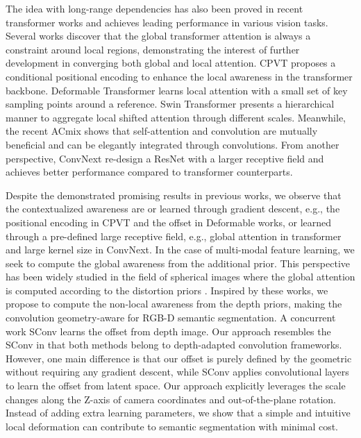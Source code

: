 \documentclass[lettersize,journal]{IEEEtran}
\begin{document}
The idea with long-range dependencies has also been proved in recent transformer works \cite{vaswani2017attention,vit,liu2021Swin} and achieves leading performance in various vision tasks. Several works \cite{chu2021conditional,liu2021Swin} discover that the global transformer attention is always a constraint around local regions, demonstrating the interest of further development in converging both global and local attention. CPVT \cite{chu2021conditional} proposes a conditional positional encoding to enhance the local awareness in the transformer backbone. Deformable Transformer \cite{deformabledetr} learns local attention with a small set of key sampling points around a reference. Swin Transformer \cite{liu2021Swin} presents a hierarchical manner to aggregate local shifted attention through different scales. Meanwhile, the recent ACmix \cite{pan2021integration} shows that self-attention and convolution are mutually beneficial and can be elegantly integrated through  convolutions. From another perspective, ConvNext \cite{liu2022convnet} re-design a ResNet with a larger receptive field and achieves better performance compared to transformer counterparts.

Despite the demonstrated promising results in previous works, we observe that the contextualized awareness are or learned through gradient descent, e.g., the positional encoding in CPVT and the offset in Deformable works, or learned through a pre-defined large receptive field, e.g., global attention in transformer and large kernel size in ConvNext. In the case of multi-modal feature learning, we seek to compute the global awareness from the additional prior. This perspective has been widely studied in the field of spherical images where the global attention is computed according to the distortion priors  \cite{cohen2018Spherical,coors2018spherenet,tateno2018distortion,CFL}. Inspired by these works, we propose to compute the non-local awareness from the depth priors, making the convolution geometry-aware for RGB-D semantic segmentation. A concurrent work SConv \cite{chen2021spatial} learns the offset from depth image. Our approach resembles the SConv in that both methods belong to depth-adapted convolution frameworks. However, one main difference is that our offset is purely defined by the geometric without requiring any gradient descent, while SConv applies convolutional layers to learn the offset from latent space. Our approach explicitly leverages the scale changes along the Z-axis of camera coordinates and out-of-the-plane rotation. Instead of adding extra learning parameters, we show that a simple and intuitive local deformation can contribute to semantic segmentation with minimal cost. 
\end{document}
